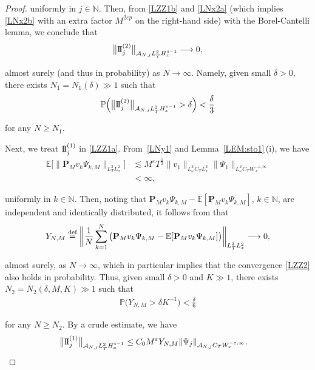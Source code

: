 \documentclass[letterpaper, 11pt,  reqno]{amsart}
\newcommand{\1}{\hspace{0.5mm}\text{I}\hspace{0.2mm}}
\newcommand{\II}{\text{I \hspace{-2.8mm} I} }
\newcommand{\noi}{\noindent}
\newcommand{\N}{\mathbb{N}}
\newcommand{\E}{\mathbb{E}}
\newcommand{\PP}{\mathbb{P}}
\newcommand{\eps}{\varepsilon}
\newcommand{\dl}{\delta}
\newcommand{\les}{\lesssim}
\renewcommand{\P}{\mathbf{P}}
\newcommand{\A}{\mathcal{A}}
\newcommand{\deff}{\stackrel{\textup{def}}{=}}
\newcommand{\too}{\longrightarrow}
\renewcommand{\o}{\omega}
\numberwithin{equation}{section}
\numberwithin{theorem}{section}
\begin{document}
\begin{proof}
\noi
uniformly in $j \in \N$.
Then, from \eqref{LZZ1b} and \eqref{LNx2a}
(which implies
\eqref{LNx2b} with an extra factor $M^{2\eps p }$ on the right-hand side)
with   the Borel-Cantelli lemma, we conclude that
\begin{align*}
\big\| \II^{(2)}_j \big\|_{\A_{N, j}L_T^2 H_x^{s-1}} 
\too 0, 
\end{align*}

\noi
almost surely (and thus in probability) as $N \to \infty$.
Namely, given small $\dl > 0$, 
there exists $N_1  = N_1(\dl) \gg 1$ such that
\begin{align}
\PP\Big(\big\|\II^{(2)}_j \big\|_{\A_{N, j}L_T^2 H_x^{s-1}} > \dl  \Big) < \frac \dl 3
\label{LZZ1c}
\end{align}

\noi
for any $N \ge N_1$.

Next, we treat $\II^{(1)}_j$ in \eqref{LZZ1a}.
From~\eqref{LNy1}
and Lemma~\ref{LEM:sto1}\,(i), we have 
\begin{align*}
\E\Big[
\|\P_M v_k \Psi_{k, M} 
\|_{L^2_T L^2_x}\Big]
& \les
M^\eps T^\frac 12 
\| v_1 \|_{L^2_\o C_T L^2_x}
\|\Psi_1\|_{L^2_\o  C_T W^{-\eps, \infty}_x}\\
& < \infty, 
\end{align*}

\noi
uniformly in $k \in \N$.
Then, 
noting
that $\P_M v_k \Psi_{k, M}  - \E [\P_M v_k\Psi_{k, M}]$, $k \in \N$, 
are independent and identically distributed, 
it follows from \cite[Corollary 7.10 on p.\,189]{LT}
that 
\begin{align}
Y_{N, M} \deff
\bigg\|\frac 1N \sum_{k = 1}^N 
\big( \P_M v_k \Psi_{k, M}  - \E [\P_M v_k\Psi_{k, M} ] \big)
\bigg\|_{L^2_T L^2_x}
\too 0, 
\label{LZZ2}
\end{align}

\noi
almost surely, as $N \to \infty$, 
which in particular implies that the convergence \eqref{LZZ2}
also holds in probability.
Thus, given small $\dl > 0$ and $K \gg1$, there exists $N_2 = N_2 (\dl, M, K) \gg 1$ such that 
\begin{align}
\PP\Big(Y_{N, M} > \dl K^{-1} \Big) < \frac \dl 6
\label{LZZ2a}
\end{align}

\noi
for any $N \ge N_2$.
By a crude estimate, we have
\begin{align}
\big\|\II_j^{(1)} \big\|_{\A_{N, j}L^2_T H^{s-1}_x}
& \le C_0  
M^\eps
Y_{N, M} 
\|\Psi_{j}\|_{\A_{N, j}C_T W^{-\eps, \infty}_x}.
\label{LZZ3}
\end{align}


\end{proof}
\end{document}
